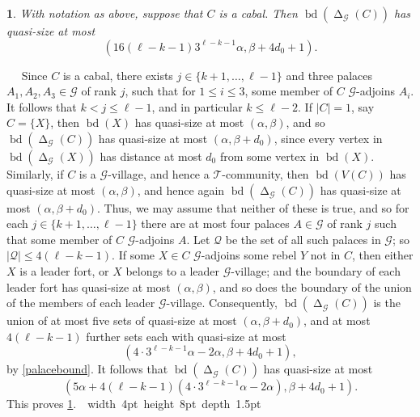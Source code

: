 \documentclass[titlepage,11pt]{article}
\newcommand\blackslug{\hbox{\hskip 1pt \vrule width 4pt height 8pt depth 1.5pt
		\hskip 1pt}}
\newcommand\bbox{\hfill \quad \blackslug \bigbreak}
\def\LL{,\ldots,}
\newcommand{\voro}{\operatorname{\Delta}}
\newcommand{\bd}{\operatorname{bd}}
\newcommand{\mac}{\mathcal}
\newtheorem{thm}{}[section]
\newcommand{\Proof}{\noindent{\bf Proof.}\ \ }
\begin{document}
	\begin{thm}\label{cabalsaresmall}
		With notation as above, suppose that $C$ is a cabal.
		Then $\bd(\voro_{\mac G}(C))$ has quasi-size at most
		$$(16(\ell-k-1)3^{\ell-k-1}\alpha, \beta+4d_0+1).$$
	\end{thm}
	\Proof
	Since $C$ is a cabal, there exists $j\in \{k+1\LL \ell-1\}$ and three palaces $A_1,A_2,A_3\in \mac G$ of rank $j$, such that for $1\le i\le 3$,
	some member of $C$ $\mac G$-adjoins $A_i$. It follows that $k<j\le \ell-1$, and in particular $k\le \ell-2$.
	If $|C|=1$, say $C=\{X\}$, then $\bd(X)$ has quasi-size at most $(\alpha,\beta)$, and so $\bd(\voro_{\mac G}(C))$ has quasi-size at most $(\alpha,\beta+d_0)$, since every
	vertex in $\bd(\voro_{\mac G}(X))$ has distance at most $d_0$ from some vertex in $\bd(X)$. Similarly, if $C$ is a $\mac G$-village, and hence a $\mac T$-community, then $\bd(V(C))$
	has quasi-size at most
	$(\alpha,\beta)$, and hence again $\bd(\voro_{\mac G}(C))$ has quasi-size at most $(\alpha,\beta+d_0)$. Thus, we may assume that neither of these
	is true, and so for each $j\in \{k+1\LL \ell-1\}$ there are at most four palaces $A\in \mac G$ of rank $j$ such that some member of 
	$C$ $\mac G$-adjoins $A$.
	Let $\mac Q$ be the set of all such palaces in $\mac G$; so $|\mac Q|\le 4(\ell-k-1)$.  If some $X\in C$ $\mac G$-adjoins some rebel $Y$
	not in $C$, then either $X$ is a leader fort, or $X$ belongs to a leader $\mac G$-village; and
	the boundary of each leader fort has quasi-size at most $(\alpha, \beta)$, and so does the boundary of the union
	of the members of each leader $\mac G$-village. Consequently, $\bd(\voro_{\mac G}(C))$ is the union of at most five sets of quasi-size at most $(\alpha, \beta+d_0)$, and at most
	$4(\ell-k-1)$ further sets each with quasi-size at most
	$$\left(4\cdot 3^{\ell-k-1}\alpha-2\alpha, \beta+4d_0+1\right),$$
	by \ref{palacebound}.
	It follows that $\bd(\voro_{\mac G}(C))$ has quasi-size at most
	$$\left(5\alpha+4(\ell-k-1)\left(4\cdot 3^{\ell-k-1}\alpha-2\alpha\right),\beta+4d_0+1\right).$$
	This proves \ref{cabalsaresmall}.~\bbox
	
\end{document}
